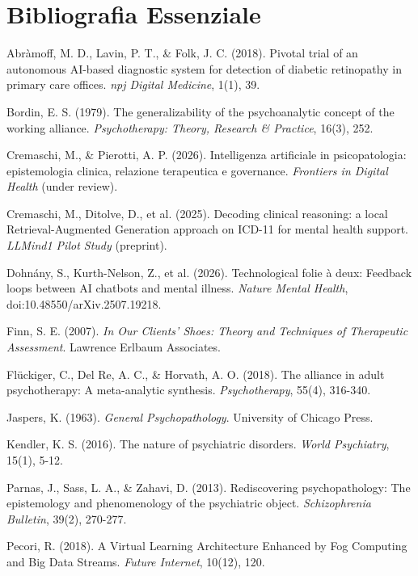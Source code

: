 \documentclass[11pt,a4paper]{article}
\begin{document}
\section{Bibliografia Essenziale}

\begin{enumerate}[label={[\arabic*]}]
    \item Abràmoff, M. D., Lavin, P. T., \& Folk, J. C. (2018). Pivotal trial of an autonomous AI-based diagnostic system for detection of diabetic retinopathy in primary care offices. \textit{npj Digital Medicine}, 1(1), 39.
    \item Bordin, E. S. (1979). The generalizability of the psychoanalytic concept of the working alliance. \textit{Psychotherapy: Theory, Research \& Practice}, 16(3), 252.
    \item Cremaschi, M., \& Pierotti, A. P. (2026). Intelligenza artificiale in psicopatologia: epistemologia clinica, relazione terapeutica e governance. \textit{Frontiers in Digital Health} (under review).
    \item Cremaschi, M., Ditolve, D., et al. (2025). Decoding clinical reasoning: a local Retrieval-Augmented Generation approach on ICD-11 for mental health support. \textit{LLMind1 Pilot Study} (preprint).
    \item Dohnány, S., Kurth-Nelson, Z., et al. (2026). Technological folie à deux: Feedback loops between AI chatbots and mental illness. \textit{Nature Mental Health}, doi:10.48550/arXiv.2507.19218.
    \item Finn, S. E. (2007). \textit{In Our Clients' Shoes: Theory and Techniques of Therapeutic Assessment}. Lawrence Erlbaum Associates.
    \item Flückiger, C., Del Re, A. C., \& Horvath, A. O. (2018). The alliance in adult psychotherapy: A meta-analytic synthesis. \textit{Psychotherapy}, 55(4), 316-340.
    \item Jaspers, K. (1963). \textit{General Psychopathology}. University of Chicago Press.
    \item Kendler, K. S. (2016). The nature of psychiatric disorders. \textit{World Psychiatry}, 15(1), 5-12.
    \item Parnas, J., Sass, L. A., \& Zahavi, D. (2013). Rediscovering psychopathology: The epistemology and phenomenology of the psychiatric object. \textit{Schizophrenia Bulletin}, 39(2), 270-277.
    \item Pecori, R. (2018). A Virtual Learning Architecture Enhanced by Fog Computing and Big Data Streams. \textit{Future Internet}, 10(12), 120.

\end{enumerate}
\end{document}
